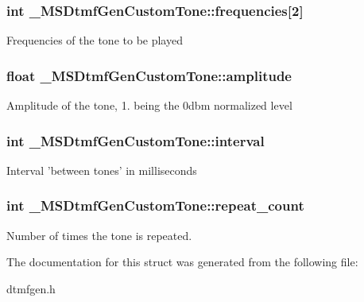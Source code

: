 \subsubsection[{frequencies}]{\setlength{\rightskip}{0pt plus 5cm}int \-\_\-\-M\-S\-Dtmf\-Gen\-Custom\-Tone\-::frequencies[2]}\label{struct__MSDtmfGenCustomTone_a99a919823a880e4dc0a93658552544dc}
Frequencies of the tone to be played 
\subsubsection[{amplitude}]{\setlength{\rightskip}{0pt plus 5cm}float \-\_\-\-M\-S\-Dtmf\-Gen\-Custom\-Tone\-::amplitude}\label{struct__MSDtmfGenCustomTone_a90d0f5b8d13fd5587e77806ecdfd7455}
Amplitude of the tone, 1. being the 0dbm normalized level 
\subsubsection[{interval}]{\setlength{\rightskip}{0pt plus 5cm}int \-\_\-\-M\-S\-Dtmf\-Gen\-Custom\-Tone\-::interval}\label{struct__MSDtmfGenCustomTone_a604e9376bdd62d37d56c50c8343b0343}
Interval 'between tones' in milliseconds 
\subsubsection[{repeat\-\_\-count}]{\setlength{\rightskip}{0pt plus 5cm}int \-\_\-\-M\-S\-Dtmf\-Gen\-Custom\-Tone\-::repeat\-\_\-count}\label{struct__MSDtmfGenCustomTone_a7b337483f7911a1737440def4b85292b}
Number of times the tone is repeated. 

The documentation for this struct was generated from the following file\-:\begin{DoxyCompactItemize}
\item 
dtmfgen.\-h\end{DoxyCompactItemize}

